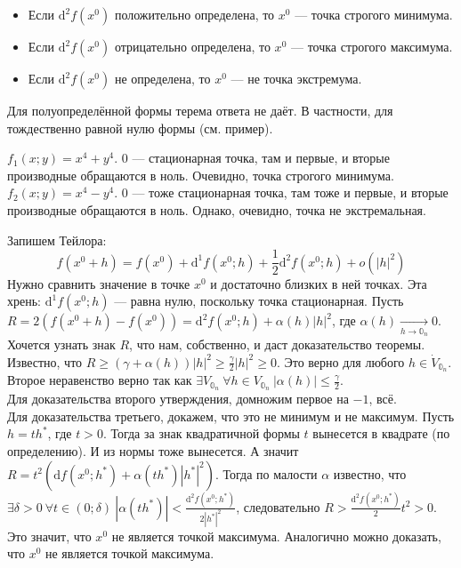 \documentclass{article}
\begin{document}
\begin{itemize}
        \begin{itemize}
            \item Если $\mathrm d^2f(x^0)$ положительно определена, то $x^0$ --- точка строгого минимума.
            \item Если $\mathrm d^2f(x^0)$ отрицательно определена, то $x^0$ --- точка строгого максимума.
            \item Если $\mathrm d^2f(x^0)$ не определена, то $x^0$ --- не точка экстремума.
        \end{itemize}
        \begin{Comment}
            Для полуопределённой формы терема ответа не даёт. В частности, для тождественно равной нулю формы (см. пример).
        \end{Comment}
        \begin{Example}
            $f_1(x;y)=x^4+y^4$. $0$ --- стационарная точка, там и первые, и вторые производные обращаются в ноль. Очевидно, точка строгого минимума.\\
            $f_2(x;y)=x^4-y^4$. $0$ --- тоже стационарная точка, там тоже и первые, и вторые производные обращаются в ноль. Однако, очевидно, точка не экстремальная.
        \end{Example}
        \begin{Proof}
            Запишем Тейлора:
            \[
            f(x^0+h)=f(x^0)+\mathrm d^1f(x^0;h)+\frac12\mathrm d^2f(x^0;h)+o(|h|^2)
            \]
            Нужно сравнить значение в точке $x^0$ и достаточно близких в ней точках. Эта хрень: $\mathrm d^1f(x^0;h)$ --- равна нулю, поскольку точка стационарная. Пусть $R=2(f(x^0+h)-f(x^0))=\mathrm d^2f(x^0;h)+\alpha(h)|h|^2$, где $\alpha(h)\underset{h\to\mathbb0_n}\longrightarrow0$. Хочется узнать знак $R$, что нам, собственно, и даст доказательство теоремы.\\
            Известно, что $R\geqslant(\gamma+\alpha(h))|h|^2\geqslant\frac\gamma2|h|^2\geqslant0$. Это верно для любого $h\in\dot V_{\mathbb0_n}$. Второе неравенство верно так как $\exists V_{\mathbb0_n}~\forall h\in V_{\mathbb0_n}~|\alpha(h)|\leqslant\frac\gamma2$.\\
            Для доказательства второго утверждения, домножим первое на $-1$, всё.\\
            Для доказательства третьего, докажем, что это не минимум и не максимум. Пусть $h=th^*$, где $t>0$. Тогда за знак квадратичной формы $t$ вынесется в квадрате (по определению). И из нормы тоже вынесется. А значит $R=t^2(\mathrm df(x^0;h^*)+\alpha(th^*)|h^*|^2)$. Тогда по малости $\alpha$ известно, что $\exists\delta>0~\forall t\in(0;\delta)~|\alpha(th^*)|<\frac{\mathrm d^2f(x^0;h^*)}{2|h^*|^2}$, следовательно $R>\frac{\mathrm d^2f(x^0;h^*)}2t^2>0$. Это значит, что $x^0$ не является точкой максимума. Аналогично можно доказать, что $x^0$ не является точкой максимума.

\end{Proof}
\end{itemize}
\end{document}
